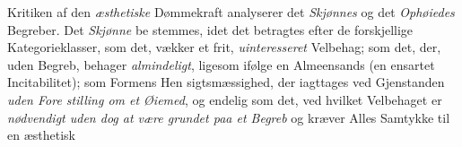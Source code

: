 \documentclass[12pt,a4paper]{book}
\begin{document}
Kritiken af den \emph{æsthetiske} Dømmekraft analyserer det
\emph{Skjønnes} og det \emph{Ophøiedes} Begreber. Det \emph{Skjønne} be\-%
stemmes, idet det betragtes efter de forskjellige Kategorieklasser,
som det, vækker et frit, \emph{uinteresseret} Velbehag; som det,
der, uden Begreb, behager \emph{almindeligt}, ligesom ifølge en
Almeensands (en ensartet Incitabilitet); som Formens Hen\-%
sigtsmæssighed, der iagttages ved Gjenstanden \emph{uden Fore\-%
stilling om et Øiemed}, og endelig som det, ved hvilket
Velbehaget er \emph{nødvendigt uden dog at være grundet
paa et Begreb} og kræver Alles Samtykke til en æsthetisk
\end{document}

